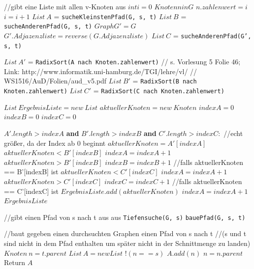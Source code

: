\documentclass{article}
\begin{document}
\begin{codebox}
	\zi //gibt eine Liste mit allen v-Knoten aus
    \li $int i = 0$
    \li \For $Knoten n in G$
    	\Indentmore
		\li $n.zahlenwert = i$
		\li $i = i + 1$
	\End
    \li $List~A$ = \texttt{sucheKleinstenPfad(G, s, t)}
    \li $List~B$ = \texttt{sucheAnderenPfad(G, s, t)}
    \li $Graph G' = G$
    \li $G'.Adjazenzliste = reverse(G.Adjazenzliste)$
    \li $List~C$ = \texttt{sucheAnderenPfad(G', s, t)}
    
    \li $List~A'$ = \texttt{RadixSort(A nach Knoten.zahlenwert)}
    \zi // s. Vorlesung 5 Folie 46; Link: http://www.informatik.uni-hamburg.de/TGI/lehre/vl/
    \zi // WS1516/AuD/Folien/aud\_v5.pdf
    \li $List~B'$ = \texttt{RadixSort(B nach Knoten.zahlenwert)}
    \li $List~C'$ = \texttt{RadixSort(C nach Knoten.zahlenwert)}

    \li $List~ErgebnisListe = new~List$
    \li $aktuellerKnoten = new~Knoten$
    \li $indexA = 0$
    \li $indexB = 0$
    \li $indexC = 0$

    \li \While $A'.length > indexA$ \textbf{and} $B'.length > indexB$ \textbf{and} $C'.length > indexC:$
    \zi //echt größer, da der Index ab 0 beginnt
    	\Indentmore
        \li $aktuellerKnoten = A'[indexA]$
        \li \If $aktuellerKnoten < B'[indexB]$
        	\Indentmore
            \li $indexA = indexA + 1$
        \li \Else \If $aktuellerKnoten > B'[indexB]$
            \li $indexB = indexB + 1$
        \li \Else
        \zi //falls aktuellerKnoten == B'[indexB] ist
            \li \If $aktuellerKnoten < C'[indexC]$
            	\Indentmore
				\li $indexA = indexA + 1$
			\li \Else \If $aktuellerKnoten > C'[indexC]$
				\li $indexC = indexC + 1$
			\li \Else
			\zi //falls aktuellerKnoten == C'[indexC] ist
				\li $ErgebnisListe.add(aktuellerKnoten)$
				\li $indexA = indexA + 1$
			\End
		\End
	\End
    \li \Return $ErgebnisListe$
\end{codebox}    

\begin{codebox}
	\zi //gibt einen Pfad von s nach t aus aus
    \li \texttt{Tiefensuche(G, s)}
    \li \Return \texttt{bauePfad(G, s, t)}
\end{codebox}

\begin{codebox}
	\zi //baut gegeben einen durchsuchten Graphen einen Pfad von s nach t
	\zi //(s und t sind nicht in dem Pfad enthalten um später nicht in der Schnittmenge zu landen)
    \li $Knoten~n = t.parent$
    \li $List~A = new List$
    \li \While $!(n == s)$
        \li $A.add(n)$
        \li $n = n.parent$
    \li \li Return $A$
\end{codebox}    
\end{document}
